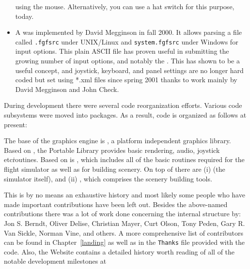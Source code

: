 \begin{itemize}
using the mouse. Alternatively, you can use a hat switch for this purpose, today.
\item A  was implemented by David Megginson in
fall 2000. It allows parsing a file called \texttt{.fgfsrc} under
UNIX/Linux and \texttt{system.fgfsrc} under Windows for input
options. This plain ASCII file has proven useful in submitting the growing number of
input options, and notably the . This has shown to be a useful
concept, and joystick, keyboard, and panel settings are no longer hard coded but set
using *.xml files since spring 2001 thanks to work mainly by David Megginson and John
Check.
\end{itemize}

During development there were several code reorganization efforts. Various code
subsystems were moved into packages. As a result, code is organized as follows at present:
\medskip

The base of the graphics engine is \textbf{}, a platform independent
graphics library. Based on , the Portable Library \PLIB{}
provides basic rendering, audio, joystick etc\. routines. Based on \PLIB{} is
\SimGear{}, which includes all of the basic routines required for the
flight simulator as well as for building scenery. On top of \SimGear{}
there are (i) \FlightGear{} (the simulator itself), and (ii)
\TerraGear{}, which comprises the scenery building tools.

This is by no means an exhaustive history and most likely some people who have made
important contributions have been left out. Besides the above-named contributions there
was a lot of work done concerning the internal structure by: Jon S. Berndt, Oliver Delise,  Christian Mayer, 
Curt Olson, Tony Peden,  Gary R. Van
Sickle, Norman Vine, and others. A more
comprehensive list of contributors can be found in Chapter~\ref{landing} as well as in
the \texttt{Thanks} file provided with the code. Also, the \FlightGear{}
Website contains a detailed history worth reading of all of the
notable development milestones at
 \medskip

